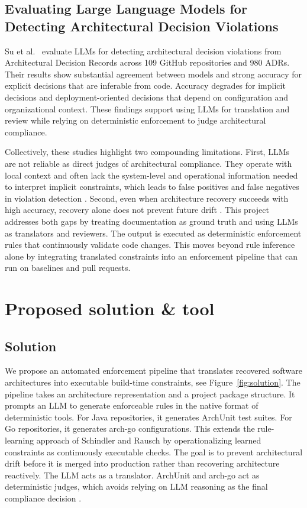 \documentclass[sigconf,screen]{acmart}
\begin{document}
\subsection{Evaluating Large Language Models for Detecting Architectural Decision Violations}
Su et al.~\cite{su2026evaluating} evaluate LLMs for detecting architectural decision violations from Architectural Decision Records across 109 GitHub repositories and 980 ADRs. Their results show substantial agreement between models and strong accuracy for explicit decisions that are inferable from code. Accuracy degrades for implicit decisions and deployment-oriented decisions that depend on configuration and organizational context. These findings support using LLMs for translation and review while relying on deterministic enforcement to judge architectural compliance.

Collectively, these studies highlight two compounding limitations. First, LLMs are not reliable as direct judges of architectural compliance. They operate with local context and often lack the system-level and operational information needed to interpret implicit constraints, which leads to false positives and false negatives in violation detection \cite{tessa2025,su2026evaluating}. Second, even when architecture recovery succeeds with high accuracy, recovery alone does not prevent future drift \cite{pan2026}. This project addresses both gaps by treating documentation as ground truth and using LLMs as translators and reviewers. The output is executed as deterministic enforcement rules that continuously validate code changes. This moves beyond rule inference alone \cite{schindler2024} by integrating translated constraints into an enforcement pipeline that can run on baselines and pull requests.


\section{Proposed solution \& tool}
\subsection{Solution}
We propose an automated enforcement pipeline that translates recovered software architectures into executable build-time constraints, see Figure~\ref{fig:solution}. The pipeline takes an architecture representation and a project package structure. It prompts an LLM to generate enforceable rules in the native format of deterministic tools. For Java repositories, it generates ArchUnit test suites. For Go repositories, it generates arch-go configurations. This extends the rule-learning approach of Schindler and Rausch \cite{schindler2024} by operationalizing learned constraints as continuously executable checks. The goal is to prevent architectural drift before it is merged into production rather than recovering architecture reactively. The LLM acts as a translator. ArchUnit and arch-go act as deterministic judges, which avoids relying on LLM reasoning as the final compliance decision \cite{su2026evaluating}.
\end{document}
